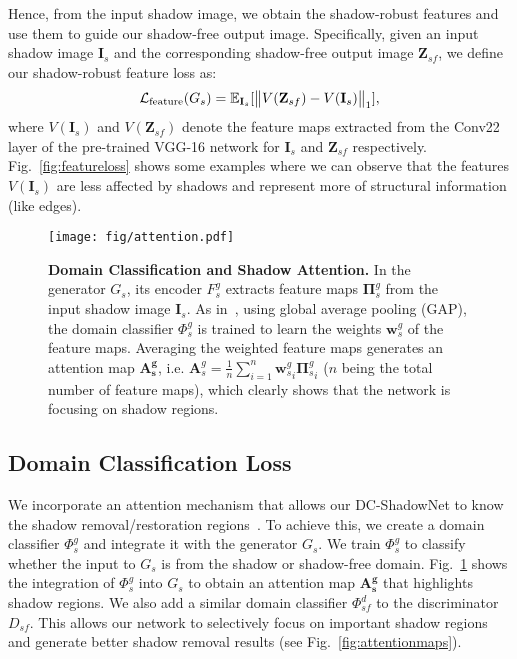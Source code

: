 \documentclass[10pt,twocolumn,letterpaper]{article}
\begin{document}
Hence, from the input shadow image, we obtain the shadow-robust features and use them to guide our shadow-free output image. 
Specifically, given an input shadow image $\mathbf{I}_s$ and the corresponding shadow-free output image $\mathbf{Z}_{sf}$, we define our shadow-robust feature loss as:
\begin{equation}
	\mathcal{L}_{\rm feature}(G_s) = \mathbb{E}_{\mathbf{I}_s}
	[\big\lVert V(\mathbf{Z}_{sf}) - V(\mathbf{I}_s)\big\rVert_1],
	\label{eqn_inv_feature}
\end{equation}
where $V(\mathbf{I}_s)$ and $V(\mathbf{Z}_{sf})$ denote the feature maps extracted from the Conv22 layer of the pre-trained VGG-16 network for $\mathbf{I}_s$ and $\mathbf{Z}_{sf}$ respectively. Fig.~\ref{fig:featureloss} shows some examples where we can observe that the features $V(\mathbf{I}_s)$ are less affected by shadows and represent more of structural information (like edges).

\begin{figure}[t]
	\begin{center}
		\captionsetup[subfigure]{labelformat=empty}
		{\texttt{[image: fig/attention.pdf]}}
		\vspace{-0.125in}	
	\end{center}
	\vspace{-0.2in}
	\caption
	{\textbf{Domain Classification and Shadow Attention.} 
	In the generator $G_s$, its encoder $F^g_s$ extracts feature maps $\mathbf{\Pi}^g_s$ from the input shadow image $\mathbf{I}_s$. As in~\cite{zhou2016learning}, using global average pooling (GAP), the domain classifier $\Phi^g_s$ is trained to learn the weights $\mathbf{w}^g_s$ of the feature maps. Averaging the weighted feature maps generates an attention map $\mathbf{A^g_{s}}$, i.e. $\mathbf{A}^g_s = \frac{1}{n}\sum_{i=1}^{n}{\mathbf{w}^g_s}_i {\mathbf{\Pi}^g_s}_i$ ($n$ being the total number of feature maps), which clearly shows that the network is focusing on shadow regions.}
	\label{fig:camattention}
	\vspace{-0.1in}
\end{figure}

\subsection{Domain Classification Loss}
We incorporate an attention mechanism that allows our DC-ShadowNet to know the shadow removal/restoration regions~\cite{zhou2016learning, qian2018attentive, Kim2020U-GAT-IT:}. 
To achieve this, we create a domain classifier $\Phi^g_s$ and integrate it with the generator $G_s$. We train $\Phi^g_s$ to classify whether the input to $G_s$ is from the shadow or shadow-free domain. Fig.~\ref{fig:camattention} shows the integration of $\Phi^g_s$ into $G_s$ to obtain an attention map $\mathbf{A^g_{s}}$ that highlights shadow regions. 
We also add a similar domain classifier $\Phi^d_{sf}$ to the discriminator $D_{sf}$.
This allows our network to selectively focus on important shadow regions and generate better shadow removal results (see Fig.~\ref{fig:attentionmaps}).
\end{document}
